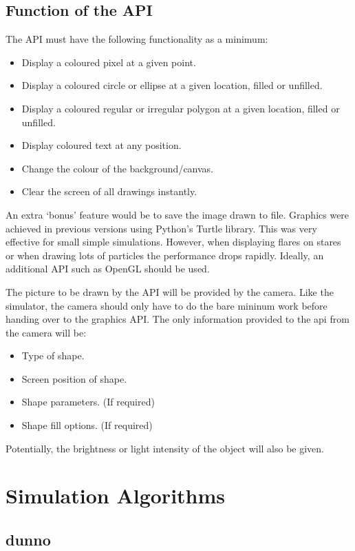 \documentclass{report}
\begin{document}
    \section{Function of the API}
      The API must have the following functionality as a minimum:
      \begin{itemize}
        \item Display a coloured pixel at a given point.
        \item Display a coloured circle or ellipse at a given location, filled or unfilled.
        \item Display a coloured regular or irregular polygon at a given location, filled or unfilled.
        \item Display coloured text at any position.
        \item Change the colour of the background/canvas.
        \item Clear the screen of all drawings instantly.
      \end{itemize}
      An extra `bonus' feature would be to save the image drawn to file.
      Graphics were achieved in previous versions using Python's Turtle library. This was very effective
      for small simple simulations. However, when displaying flares on stares or when drawing lots of particles
      the performance drops rapidly. Ideally, an additional API such as OpenGL should be used.

      The picture to be drawn by the API will be provided by the camera. Like the simulator, the camera should
      only have to do the bare mininum work before handing over to the graphics API. The only information provided
      to the api from the camera will be:
      \begin{itemize}
        \item Type of shape.
        \item Screen position of shape.
        \item Shape parameters. (If required)
        \item Shape fill options. (If required)
      \end{itemize}
      Potentially, the brightness or light intensity of the object will also be given.

  \chapter{Simulation Algorithms}
    \section{dunno}
\end{document}
